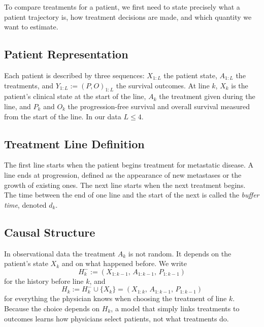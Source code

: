 \documentclass[a4paper,10pt]{article}
\begin{document}
To compare treatments for a patient, we first need to state precisely what a patient trajectory is, how treatment decisions are made, and which quantity we want to estimate.

\subsection{Patient Representation}

Each patient is described by three sequences: $X_{1:L}$ the patient state, $A_{1:L}$ the treatments, and $Y_{1:L} := (P, O)_{1:L}$ the survival outcomes. At line $k$, $X_k$ is the patient's clinical state at the start of the line, $A_k$ the treatment given during the line, and $P_k$ and $O_k$ the progression-free survival and overall survival measured from the start of the line. In our data $L \leq 4$.

\subsection{Treatment Line Definition}

The first line starts when the patient begins treatment for metastatic disease. A line ends at progression, defined as the appearance of new metastases or the growth of existing ones. The next line starts when the next treatment begins. The time between the end of one line and the start of the next is called the \textit{buffer time}, denoted $d_k$.

\subsection{Causal Structure}

In observational data the treatment $A_k$ is not random. It depends on the patient's state $X_k$ and on what happened before. We write
\begin{equation}
    H_k^- := (X_{1:k-1},\, A_{1:k-1},\, P_{1:k-1})
\end{equation}
for the history before line $k$, and
\begin{equation}
    H_k := H_k^- \cup \{X_k\} = (X_{1:k},\, A_{1:k-1},\, P_{1:k-1})
\end{equation}
for everything the physician knows when choosing the treatment of line $k$. Because the choice depends on $H_k$, a model that simply links treatments to outcomes learns how physicians select patients, not what treatments do.
\end{document}
